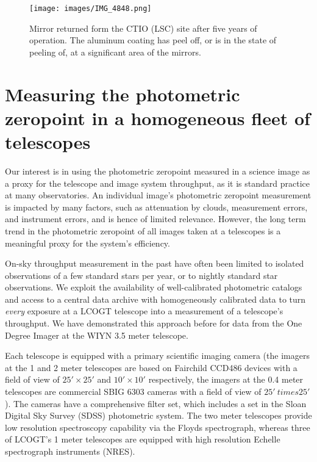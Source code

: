 \documentclass[]{spieman}
\begin{document}
\begin{figure}
\texttt{[image: images/IMG\_4848.png]}
\caption{\label{fig_mirrorpeel} Mirror returned form the CTIO (LSC) site after five years of
operation. The aluminum coating has peel off, or is in the state of peeling of, at a significant
area of the mirrors. }
\end{figure}


\section{Measuring the photometric zeropoint in a homogeneous fleet of telescopes}


Our interest is in using the photometric zeropoint measured in a science image as a proxy for the
telescope and image system throughput, as it is standard practice at many observatories. An
individual image's photometric zeropoint measurement is impacted by many factors, such as
attenuation by clouds, measurement errors, and instrument errors, and is hence of limited relevance.
However, the long term trend in the photometric zeropoint of all images taken at a telescopes is a
meaningful proxy for the system's efficiency.

On-sky throughput measurement in the past have often been limited to isolated observations of a few
standard stars per year\cite{benn2000}, or to nightly standard star observations\cite{hopp2008}. We
exploit the availability of well-calibrated photometric catalogs and access to a central
data archive with homogeneously calibrated data to turn {\em every} exposure at a LCOGT telescope
into a measurement of a telescope's throughput. We have demonstrated this approach before for data
from the One Degree Imager at the WIYN 3.5 meter telescope\cite{harbeck2014}.

Each telescope is equipped with a primary scientific imaging camera (the imagers at the 1 and 2
meter telescopes are based on Fairchild CCD486 devices with a field of view of $25' \times 25'$ and
$10' \times 10'$ respectively, the imagers at the 0.4 meter telescopes are commercial SBIG 6303
cameras with a field of view of $25' \ times 25'$). The cameras have a comprehensive filter set,
which includes a set in the Sloan Digital Sky Survey (SDSS) photometric system\cite{fukugita1996}.
The two meter telescopes provide low resolution spectroscopy capability via the
Floyds\cite{brown2013} spectrograph, whereas three of LCOGT's 1 meter telescopes are equipped with
high resolution Echelle spectrograph instruments (NRES)\cite{eastman2014,siverd2016}.
\end{document}
